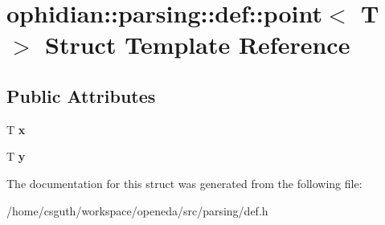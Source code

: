 \hypertarget{structophidian_1_1parsing_1_1def_1_1point}{\section{ophidian\-:\-:parsing\-:\-:def\-:\-:point$<$ T $>$ Struct Template Reference}
\label{structophidian_1_1parsing_1_1def_1_1point}
}
\subsection*{Public Attributes}
\begin{DoxyCompactItemize}
\item 
\hypertarget{structophidian_1_1parsing_1_1def_1_1point_ac56ccdf278e74261a2ea84199aa620b8}{T {\bfseries x}}\label{structophidian_1_1parsing_1_1def_1_1point_ac56ccdf278e74261a2ea84199aa620b8}

\item 
\hypertarget{structophidian_1_1parsing_1_1def_1_1point_ad53b218015fb223c7f3fbd83324dc0a3}{T {\bfseries y}}\label{structophidian_1_1parsing_1_1def_1_1point_ad53b218015fb223c7f3fbd83324dc0a3}

\end{DoxyCompactItemize}


The documentation for this struct was generated from the following file\-:\begin{DoxyCompactItemize}
\item 
/home/csguth/workspace/openeda/src/parsing/def.\-h\end{DoxyCompactItemize}
